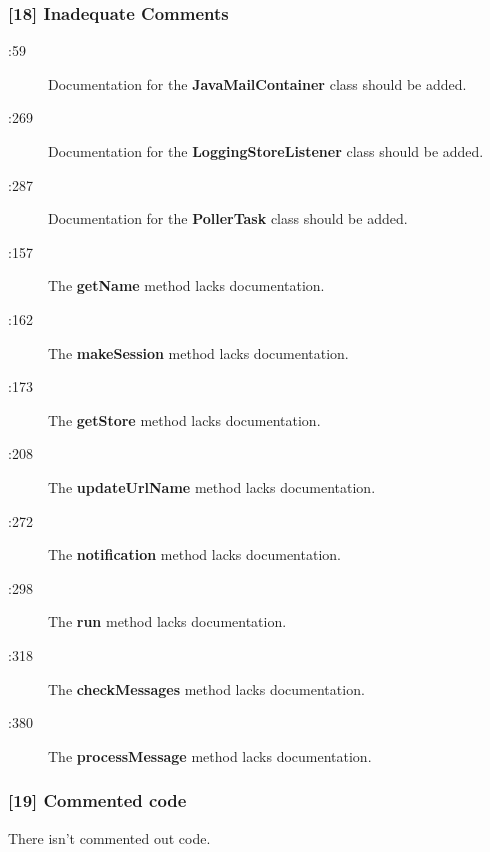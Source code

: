 \subsubsection{[18] Inadequate Comments}
\begin{description}
	\item[:59] Documentation for the \textbf{JavaMailContainer} class should be added.
	\item[:269] Documentation for the \textbf{LoggingStoreListener} class should be added.
	\item[:287] Documentation for the \textbf{PollerTask} class should be added.
	\item[:157] The \textbf{getName} method lacks documentation.
	\item[:162] The \textbf{makeSession} method lacks documentation.
	\item[:173] The \textbf{getStore} method lacks documentation.
	\item[:208] The \textbf{updateUrlName} method lacks documentation.
	\item[:272] The \textbf{notification} method lacks documentation.
	\item[:298] The \textbf{run} method lacks documentation.
	\item[:318] The \textbf{checkMessages} method lacks documentation.
	\item[:380] The \textbf{processMessage} method lacks documentation.
\end{description}

\subsubsection{[19] Commented code}
There isn't commented out code.
